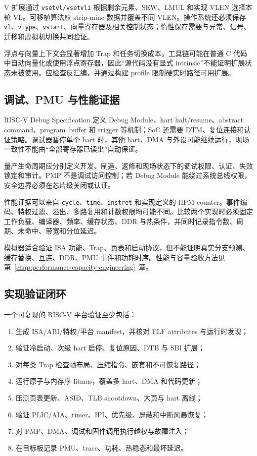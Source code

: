 V 扩展通过 \texttt{vsetvl/vsetvli} 根据剩余元素、SEW、LMUL 和实现 VLEN 选择本轮 VL。可移植算法应 strip-mine 数据并覆盖不同 VLEN。操作系统还必须保存 \texttt{vl}、\texttt{vtype}、\texttt{vstart}、向量寄存器及相关控制状态；惰性保存需要与异常、信号、迁移和虚拟机切换共同验证。

浮点与向量上下文会显著增加 Trap 和任务切换成本。工具链可能在普通 C 代码中自动向量化或使用浮点寄存器，因此“源代码没有显式 intrinsic”不能证明扩展状态未被使用。应检查反汇编，并通过构建 profile 限制硬实时路径可用扩展。

\newpage
\subsection{调试、PMU 与性能证据}

RISC-V Debug Specification 定义 Debug Module、hart halt/resume、abstract command、\mbox{program buffer} 和 trigger 等机制；SoC 还需要 DTM、复位连接和认证策略。调试器暂停单个 hart 时，其他 hart、DMA 与外设可能继续运行，现场一致性不能由“全部寄存器已读出”自动保证。

量产生命周期应分别定义开发、制造、返修和现场状态下的调试权限、认证、失败锁定和审计。PMP 不是调试访问控制；若 Debug Module 能绕过系统总线权限，安全边界必须在芯片级关闭或认证。

性能证据可以来自 \texttt{cycle}、\texttt{time}、\texttt{instret} 和实现定义的 HPM counter。事件编码、特权过滤、溢出、多路复用和计数权限均可能不同。比较两个实现时必须固定工作负载、编译器、频率、缓存状态、DDR 与热条件，并同时记录指令数、周期、未命中、带宽和分位延迟。

模拟器适合验证 ISA 功能、Trap、页表和启动协议，但不能证明真实分支预测、缓存替换、互连、DDR、PMU 事件和功耗时序。性能与容量验收方法见第~\ref{chap:performance-capacity-engineering}~章。

\subsection{实现验证闭环}

一个可复现的 RISC-V 平台验证至少包括：
\begin{enumerate}
  \item 生成 ISA/ABI/特权/平台 manifest，并核对 ELF attributes 与运行时发现；
  \item 验证冷启动、次级 hart 启停、复位原因、DTB 与 SBI 扩展；
  \item 对每类 Trap 检查帧布局、压缩指令、嵌套和不可恢复路径；
  \item 运行原子与内存序 litmus，覆盖多 hart、DMA 和代码更新；
  \item 压测页表更新、ASID、TLB shootdown、大页与 hart 离线；
  \item 验证 PLIC/AIA、timer、IPI、优先级、屏蔽和中断风暴恢复；
  \item 对 PMP、DMA、调试和固件调用执行越权与故障注入；
  \item 在目标板记录 PMU、trace、功耗、热稳态和最坏延迟。
\end{enumerate}


